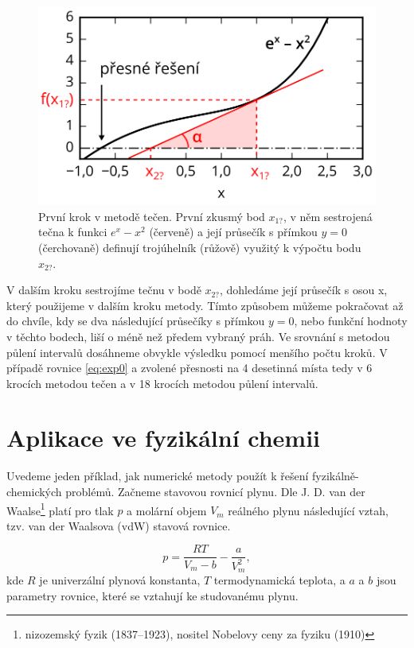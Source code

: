 \documentclass[a4paper,oneside,12pt]{article}
\begin{document}
\begin{figure}
\begin{center}
\includegraphics{./IMGS/trojuh-drawing.png}
\end{center}
\caption{První krok v metodě tečen. První zkusmý bod $x_{1?}$,
v něm sestrojená tečna k funkci $e^x - x^2$ (červeně)
a její průsečík s přímkou $y=0$
(čerchovaně) definují trojúhelník (růžově) 
využitý k výpočtu bodu $x_{2?}$.}
\label{fig:trojuh}
\end{figure}
%
V dalším kroku sestrojíme tečnu v bodě $x_{2?}$, dohledáme
její průsečík s osou x, který použijeme v dalším kroku metody.
Tímto způsobem můžeme pokračovat až do chvíle, kdy se dva 
následující průsečíky s přímkou $y=0$,
nebo funkční hodnoty v těchto bodech, liší 
o méně než předem vybraný práh. Ve srovnání s metodou 
půlení intervalů dosáhneme obvykle výsledku pomocí menšího počtu kroků.
V případě rovnice \ref{eq:exp0} a zvolené přesnosti na 4 desetinná
místa tedy v 6 krocích metodou tečen a v 18 krocích metodou 
půlení intervalů.


\section{Aplikace ve fyzikální chemii}

Uvedeme jeden příklad, jak numerické metody použít k řešení
fyzikálně-chemických problémů. Začneme stavovou rovnicí plynu.
Dle J. D.  van der Waalse\footnote{nizozemský fyzik (1837--1923),
nositel Nobelovy ceny za fyziku (1910)}
platí pro tlak $p$ a molární 
objem $V_m$ reálného plynu následující vztah, tzv. van der Waalsova
(vdW) stavová rovnice.

\begin{equation}
p = \frac{RT}{V_m - b} - \frac{a}{V_m^2},
\label{eq:vdw}
\end{equation}
%
kde $R$ je univerzální plynová konstanta, $T$ termodynamická teplota,
a $a$ a $b$ jsou parametry rovnice, které se vztahují ke studovanému
plynu.
\end{document}
